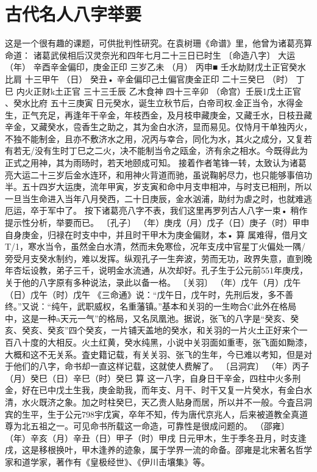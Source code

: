 \section{古代名人八字举要}
这是一个很有趣的课题，可供批判性研究。在袁树珊《命谱》里，他曾为诸葛亮算命道：
诸葛武侯相后汉灵奈光和四年七月二十三日已时生
〔命造八字〕	大运
（年）	辛酉辛金偏印，庚金正印		三岁乙未
（月）	丙申■	壬水劫财戊土正官癸水比肩	十三甲午
（日）	癸丑•	{辛金偏印己土偏官庚金正印	二十三癸巳
（时）	丁巳	{内火正财k土正官	三十三壬辰
乙木食神	四十三辛卯
（命宫）壬辰1戊土正官
、癸水比府	五十三庚寅
日元癸水，诞生立秋节后，白帝司权.金正当令，水得金生，正气充足，再逢年干辛金，年枝西金，及月枝申藏庚金，又藏壬水，日枝丑藏辛金，又藏癸水，卺香生之助之，其为金白水济，显而易见。仅恃月干单独丙火，不独不能制金，且亦不敷济水之用，况丙与幸合，同化为水，其火之成分，又复若有若无/没有生时丁巳之二火，决不能制当令之瓯金，济有余之相水。今既得此为正式之用神，其为雨旸时，若天地颐成可知。
接着作者笔锋一转，太致认为诸葛亮大运二十三岁后金水连环，和用神火背道而驰，虽说鞠躬尽力，也只能够事倍功半。五十四岁大运庚，流年甲寅，岁支寅和命中月支申相冲，与时支已相刑，所以一旦当生命进入当年八月癸西，二十日庚辰，金水汹浦，助纣为虐之时，也就难逃厄运，卒于军中了。
按下诸葛亮八字不表，我们这里再罗列古人八字一束•
稍作提示性分析，举要而已。
〔孔子〕
（年）庚戌（月）戊子（日）庚子（时）甲申
自身庚金，归禄在时支中中，并且时干甲木为庚金偏财，本•
算
属难得，借月文T/1，寒水当令，虽然金白水清，然而未免寒俭，况年支戌中官星丁火偏处一隅/旁受月支癸水制约，难以发挥。纵观孔子一生奔波，劳而无功，政界失意，直到晚年杏坛设教，弟子三千，说明金水流通，从次却好。孔子生于公元前551年庚戌，关于他的八字原有多种说法，录此以备一格。
〔关羽〕
（年）戊午（月）戊午（日）戊午（时）戊午
《三命通》说：“戊午日，戊午时，先刑后发，多不善终。”又说：“纯午，武职威权，名重藩镇。”基本和关羽的一生吻合C此外在格局中，这是一种a天元一气”的格局，又名凤凰池。据说，张飞的八字是“癸亥、癸亥、癸亥、癸亥”四个癸亥，一片铺天盖地的癸水，和关羽的一片火土正好来个一百八十度的大相反。火土红黄，癸水纯黑，小说中关羽面如重枣，张飞面如黝漆，大概和这不无关系。査史籍记载，有关关羽、张飞的生年，今已难以考知，但是对于他们的八字，命书却一直这样记载，这就使人费解了。
〔吕洞宾〕
（年）丙子（月）癸巳（日）辛巳（时）癸巳
算
这一八字，自身日干辛金，四柱中火多刑金，好在已中戊土生我，庚金助我，而年支、月干、时干又复一片癸水，有金白水清，水火既济之象。加之时柱癸巳，天乙贵人贴身而居，所以并不一般。今査吕洞宾的生平，生于公元798宇戊寅，卒年不知，传为唐代京兆人，后来被道教全真道尊为北五祖之一。可见命书所载这一命造，可靠性是很成问题的。
（邵雍〕
（年）辛亥（月）辛丑（日）甲子（时）甲戌
日元甲木，生于季冬丑月，时支逢戌，这是移根换叶，甲木逢养的迹象，属于学界一流的命备。邵雍是北宋著名哲学家和道学家，著作有《皇极经世》、《伊川击壤集》等。
}}
